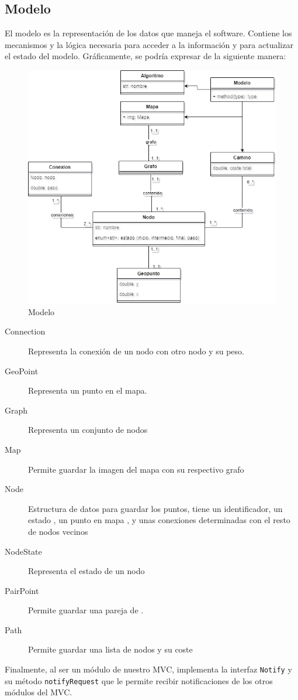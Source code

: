 \subsection{Modelo}

El modelo es la representación de los datos que maneja el software. Contiene los mecanismos y la lógica necesaria para acceder a la información y para actualizar el estado del modelo. Gráficamente, se podría expresar de la siguiente manera:

\begin{figure}[!h]
    \centering
    \includegraphics[width=\linewidth]{MVC/Model/img/model.png}
    \caption{Modelo}
    \label{fig:model}
\end{figure}

\begin{description}
\item[Connection] Representa la conexión de un nodo con otro nodo y su peso.
\item[GeoPoint] Representa un punto en el mapa.
\item[Graph] Representa un conjunto de nodos 
\item[Map] Permite guardar la imagen del mapa con su respectivo grafo
\item[Node] Estructura de datos para guardar los puntos, tiene un identificador, un estado , un punto en mapa , y unas conexiones determinadas con el resto de nodos vecinos 
\item[NodeState] Representa el estado de un nodo
\item[PairPoint] Permite guardar una pareja de .
\item[Path] Permite guardar una lista de nodos y su coste
\end{description}\bigskip

Finalmente, al ser un módulo de nuestro MVC, implementa la interfaz \texttt{Notify} y su método \texttt{notifyRequest} que le permite recibir notificaciones de los otros módulos del MVC.